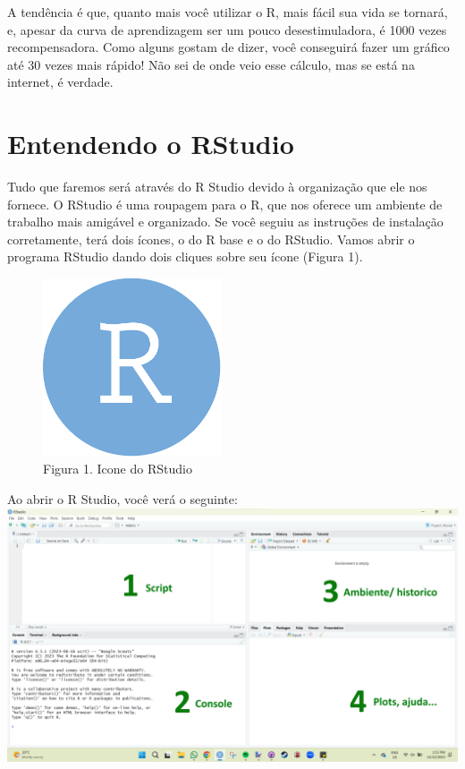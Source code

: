 \documentclass[
]{book}
\begin{document}
A tendência é que, quanto mais você utilizar o R, mais fácil sua vida se tornará, e, apesar da curva de aprendizagem ser um pouco desestimuladora, é 1000 vezes recompensadora. Como alguns gostam de dizer, você conseguirá fazer um gráfico até 30 vezes mais rápido! Não sei de onde veio esse cálculo, mas se está na internet, é verdade.

\hypertarget{entendendo-o-rstudio}{%
\section{Entendendo o RStudio}\label{entendendo-o-rstudio}}

Tudo que faremos será através do R Studio devido à organização que ele nos fornece. O RStudio é uma roupagem para o R, que nos oferece um ambiente de trabalho mais amigável e organizado. Se você seguiu as instruções de instalação corretamente, terá dois ícones, o do R base e o do RStudio. Vamos abrir o programa RStudio dando dois cliques sobre seu ícone (Figura 1).

\begin{figure}
\centering
\includegraphics[width=2.08333in,height=\textheight]{img/rstudio_logo.png}
\caption{Figura 1. Icone do RStudio}
\end{figure}

Ao abrir o R Studio, você verá o seguinte:
\includegraphics{img/cara_do_rstudio1.png}
\end{document}
